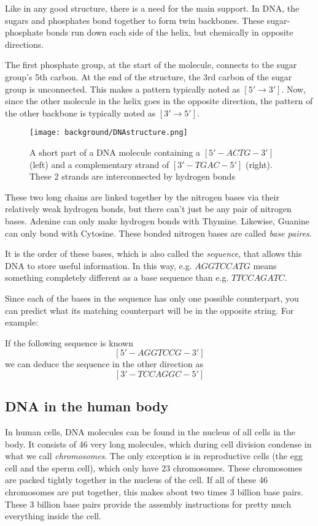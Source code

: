 Like in any good structure, there is a need for the main support. In DNA, the sugars and phosphates bond together to form twin backbones. These sugar-phosphate bonds run down each side of the helix, but chemically in opposite directions. 

The first phosphate group, at the start of the molecule, connects to the sugar group's 5th carbon. At the end of the structure, the 3rd carbon of the sugar group is unconnected. This makes a pattern typically noted as $[5' \rightarrow 3']$. Now, since the other molecule in the helix goes in the opposite direction, the pattern of the other backbone is typically noted as $[3' \rightarrow 5']$.

\begin{figure}[H]
	\centering
	\texttt{[image: background/DNAstructure.png]}
	\caption{A short part of a DNA molecule containing a $[5' - ACTG - 3']$ (left) and a complementary strand of $[3' - TGAC - 5']$ (right). These 2 strands are interconnected by hydrogen bonds}
	\label{fig:DNAstructure}
\end{figure}

These two long chains are linked together by the nitrogen bases via their relatively weak hydrogen bonds, but there can't just be any pair of nitrogen bases. Adenine can only make hydrogen bonds with Thymine. Likewise, Guanine can only bond with Cytosine. These bonded nitrogen bases are called \emph{base paires}.

It is the order of these bases, which is also called the \emph{sequence}, that allows this DNA to store useful information. In this way, e.g. $AGGTCCATG$ means something completely different as a base sequence than e.g. $TTCCAGATC$.

Since each of the bases in the sequence has only one possible counterpart, you can predict what its matching counterpart will be in the opposite string. For example:

If the following sequence is known
$$[5' - AGGTCCG - 3']$$
we can deduce the sequence in the other direction as
$$[3' - TCCAGGC - 5']$$

\subsection{DNA in the human body}

In human cells, DNA molecules can be found in the nucleus of all cells in the body. It consists of 46 very long molecules, which during cell division condense in what we call \emph{chromosomes}. The only exception is in reproductive cells (the egg cell and the sperm cell), which only have 23 chromosomes. These chromosomes are packed tightly together in the nucleus of the cell. If all of these 46 chromosomes are put together, this makes about two times 3 billion base pairs. These 3 billion base pairs provide the assembly instructions for pretty much everything inside the cell.

